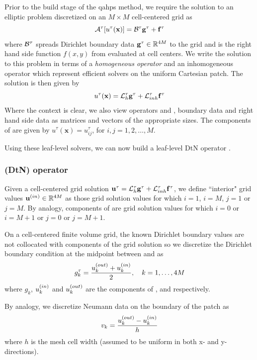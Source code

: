 Prior to the build stage of the \gls{qahps} method, we require the solution to an elliptic problem  discretized on an $M \times M$ cell-centered grid as
\begin{equation}
\mathcal{A}^{\tau}[u^{\tau}(\textbf{x})] = \mathcal B^\tau \mathbf g^{\tau} + \mathbf f^{\tau}
\label{eq:patch_poisson_problem}
\end{equation}
where $\mathcal B^\tau$ spreads Dirichlet boundary data $\mathbf g^{\tau} \in \mathbb R^{4M}$ to the grid and \ftau is the right hand side function $f(x,y)$ from  evaluated at cell centers.  We write the solution to this problem in terms of a {\em homogeneous operator} \Lhtau and an inhomogeneous operator \Linhtau which represent efficient solvers on the uniform Cartesian patch. The solution is then given by 
\begin{equation}
u^{\tau}(\textbf{x}) = \mathcal L_h^{\tau} \mathbf g^{\tau} + \mathcal L_{inh}^{\tau} \mathbf f^{\tau}
\label{eq:patch_leaf_solve}
\end{equation}
Where the context is clear, we also view operators \Lhtau and \Linhtau, boundary data \gtau and right hand side data \ftau as matrices and vectors of the appropriate sizes. The components of \utau are given by $u^{\tau}(\textbf{x}) = u^\tau_{ij}$, for $i,j = 1, 2, \hdots, M$.  

Using these leaf-level solvers, we can now build a leaf-level DtN operator \Ttau.

\subsubsection{\DtN (DtN) operator}
Given a cell-centered grid solution $\mathbf u^{\tau} = \mathcal L_h^{\tau} \mathbf g^{\tau} + \mathcal L_{inh}^{\tau} \mathbf f^{\tau}$, we define ``interior" grid values $\mathbf u^{(in)} \in \mathbb R^{4M}$ as those grid solution values \utau for which $i = 1$, $i = M$, $j = 1$ or $j = M$.  By analogy, components of \uout are grid solution values for which $i=0$ or $i = M+1$ or $j = 0$ or $j = M+1$.     

On a cell-centered finite volume grid, the known Dirichlet boundary values are not collocated with components of the grid solution so we discretize the Dirichlet boundary condition at the midpoint between \ukin and \ukout as
\begin{equation}
g_k^\tau = \frac{u_k^{(out)} + u_k^{(in)}}{2}, \quad k = 1,\hdots , 4M
\end{equation}
where $g_k$, $u_k^{(in)}$ and $u_k^{(out)}$ are the components of \gtau, \uin and \uout respectively.  

By analogy, we discretize Neumann data on the boundary of the patch as
\begin{equation}
v_k = \frac{u_k^{(out)} - u_k^{(in)}}{h}
\end{equation}
where $h$ is the mesh cell width (assumed to be uniform in both x- and y- directions).


